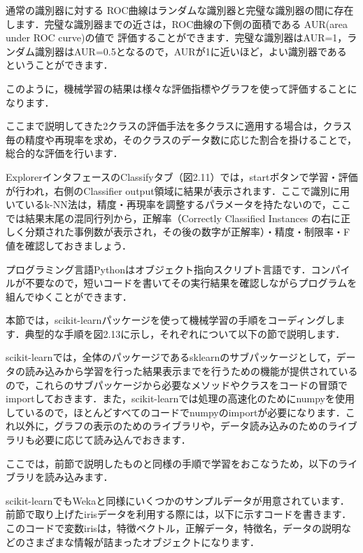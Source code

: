 通常の識別器に対する
ROC曲線はランダムな識別器と完璧な識別器の間に存在します．完璧な識別器までの近さは，ROC曲線の下側の面積である
AUR(area under ROC curve)の値で
評価することができます．完璧な識別器はAUR=1，ランダム識別器はAUR=0.5となるので，AURが1に近いほど，よい識別器である
ということができます．


このように，機械学習の結果は様々な評価指標やグラフを使って評価することになります．

ここまで説明してきた2クラスの評価手法を多クラスに適用する場合は，クラス毎の精度や再現率を求め，そのクラスのデータ数に応じた割合を掛けることで，総合的な評価を行います．


ExplorerインタフェースのClassifyタブ（図2.11）では，startボタンで学習・評価が行われ，右側のClassifier output領域に結果が表示されます．ここで識別に用いているk-NN法は，精度・再現率を調整するパラメータを持たないので，ここでは結果末尾の混同行列から，正解率（Correctly Classified Instances の右に正しく分類された事例数が表示され，その後の数字が正解率）・精度・制限率・F値を確認しておきましょう．


プログラミング言語Pythonはオブジェクト指向スクリプト言語です．コンパイルが不要なので，短いコードを書いてその実行結果を確認しながらプログラムを組んでゆくことができます．


本節では，scikit-learnパッケージを使って機械学習の手順をコーディングします．典型的な手順を図2.13に示し，それぞれについて以下の節で説明します．


scikit-learnでは，全体のパッケージであるsklearnのサブパッケージとして，データの読み込みから学習を行った結果表示までを行うための機能が提供されているので，これらのサブパッケージから必要なメソッドやクラスをコードの冒頭でimportしておきます．また，scikit-learnでは処理の高速化のためにnumpyを使用しているので，ほとんどすべてのコードでnumpyのimportが必要になります．これ以外に，グラフの表示のためのライブラリや，データ読み込みのためのライブラリも必要に応じて読み込んでおきます．

ここでは，前節で説明したものと同様の手順で学習をおこなうため，以下のライブラリを読み込みます．


scikit-learnでもWekaと同様にいくつかのサンプルデータが用意されています．前節で取り上げたirisデータを利用する際には，以下に示すコードを書きます．このコードで変数irisは，特徴ベクトル，正解データ，特徴名，データの説明などのさまざまな情報が詰まったオブジェクトになります．


